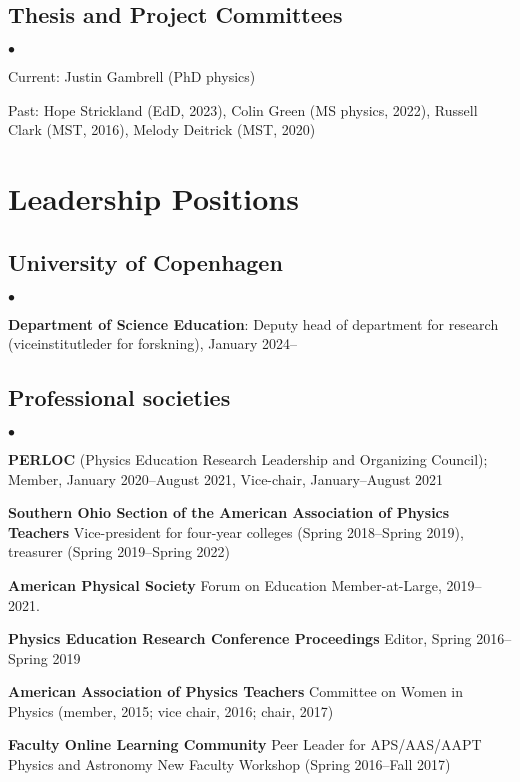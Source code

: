\documentclass[a4paper,10pt]{article}
\newcommand{\squishlist}{
	\begin{list}{$\bullet$}
		{ \setlength{\itemsep}{0pt}
			\setlength{\parsep}{3pt}
			\setlength{\topsep}{3pt}
			\setlength{\partopsep}{0pt}
			\setlength{\labelwidth}{1em}
			\setlength{\labelsep}{0.5em} } }
\newcommand{\squishend}{
\end{list}  }
\begin{document}
\subsection*{Thesis and Project Committees}
\squishlist
\item Current: Justin Gambrell (PhD physics)
\item Past: Hope Strickland (EdD, 2023), Colin Green (MS physics, 2022), Russell Clark (MST, 2016), Melody Deitrick (MST, 2020)
\squishend


\section*{Leadership Positions}

\subsection*{University of Copenhagen}
\squishlist
\item \textbf{Department of Science Education}: Deputy head of department for research (viceinstitutleder for forskning), January 2024--
\squishend

\subsection*{Professional societies}
\squishlist
\item \textbf{PERLOC} (Physics Education Research Leadership and Organizing Council); Member, January 2020--August 2021, Vice-chair, January--August 2021

\item \textbf{Southern Ohio Section of the American Association of Physics Teachers} Vice-president for four-year colleges (Spring 2018--Spring 2019), treasurer (Spring 2019--Spring 2022)

\item \textbf{American Physical Society} Forum on Education Member-at-Large, 2019--2021.

\item \textbf{Physics Education Research Conference Proceedings} Editor, Spring 2016--Spring 2019

\item \textbf{American Association of Physics Teachers} Committee on Women in Physics (member, 2015; vice chair, 2016; chair, 2017)

\item \textbf{Faculty Online Learning Community} Peer Leader for APS/AAS/AAPT Physics and Astronomy New Faculty Workshop (Spring 2016--Fall 2017)
\squishend
\end{document}
